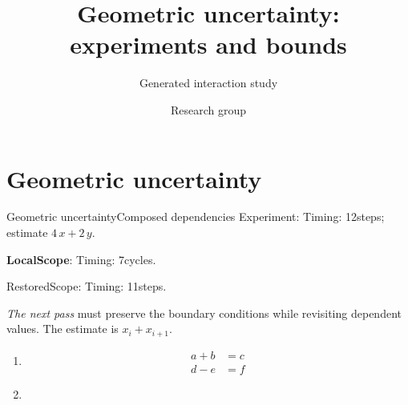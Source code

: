 \documentclass[9pt,aspectratio=169]{beamer}
\title{Geometric uncertainty: experiments and bounds}
\subtitle{Generated interaction study}
\author{Research group}
\date{}
\newcommand{\fuzzlayerA}[1]{\textrm{#1}}
\newcommand{\fuzzlayerB}[1]{\fuzzlayerA{#1}}
\newcommand{\fuzzlayerC}[1]{\fuzzlayerB{#1}}
\newcommand{\fuzzterm}[1]{\fuzzlayerC{#1}}
\newcommand{\fuzzpair}[2]{\fuzzterm{#1}: #2}
\newcommand{\fuzzunit}{steps}
\newcommand{\fuzzcoefficient}{4}
\newcommand{\fuzzscale}[2][\fuzzcoefficient]{#1\,#2}
\begin{document}
\section{Geometric uncertainty}
\begin{frame}[t,shrink=5]{Geometric uncertainty}{Composed dependencies}
\fuzzpair{Experiment}{Timing: 12\fuzzunit; estimate $\fuzzscale{x}+\fuzzscale[2]{y}$.}\par
{\renewcommand{\fuzzunit}{cycles}\let\fuzzterm\textbf\fuzzpair{LocalScope}{Timing: 7\fuzzunit.}\par}
\fuzzpair{RestoredScope}{Timing: 11\fuzzunit.}\par
{\scriptsize\color{blue}\centering
\begin{description}
\item<1->[Stage 1] {\small\color{black}\raggedright
\textit{The next pass} must preserve the boundary conditions while revisiting dependent values.  The estimate is $x_i+x_{i+1}$.\par}
\item<2->[Stage 2] \begin{enumerate}
\item \[\begin{aligned}a+b&=c\\ d-e&=f\end{aligned}\]
\item {}
\end{enumerate}
\end{description}}
\end{frame}
\end{document}
